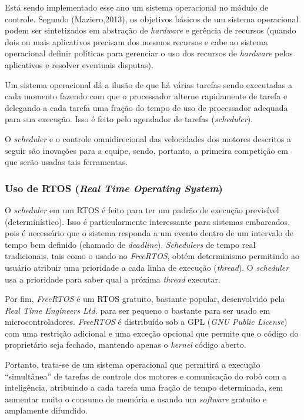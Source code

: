 \documentclass[conference]{IEEEtran}
\begin{document}
Está sendo implementado esse ano um sistema operacional no módulo de controle. Segundo (Maziero,2013)\cite{maziero}, os objetivos básicos de um sistema operacional podem ser sintetizados em abstração de \textit{hardware} e gerência de recursos (quando dois ou mais aplicativos precisam dos mesmos recursos e cabe ao sistema operacional definir políticas para gerenciar o uso dos recursos de \textit{hardware} pelos aplicativos e resolver eventuais disputas).

Um sistema operacional dá a ilusão de que há várias tarefas sendo executadas a cada momento fazendo com que o processador alterne rapidamente de tarefa e delegando a cada tarefa uma fração do tempo de uso de processador adequada para sua execução. Isso é feito pelo agendador de tarefas (\textit{scheduler}).

O \textit{scheduler} e o controle omnidirecional das velocidades dos motores descritos a seguir são inovações para a equipe, sendo, portanto, a primeira competição em que serão usadas tais ferramentas.

\subsubsection{Uso de RTOS (\textit{Real Time Operating System})}

O \textit{scheduler} em um RTOS é feito para ter um padrão de execução previsível (determinístico). Isso é particularmente interessante para sistemas embarcados, pois é necessário que o sistema responda a um evento dentro de um intervalo de tempo bem definido (chamado de \textit{deadline}). \textit{Schedulers} de tempo real tradicionais, tais como o usado no \textit{FreeRTOS}, obtém determinismo permitindo ao usuário atribuir uma prioridade a cada linha de execução (\textit{thread}). O \textit{scheduler} usa a prioridade para saber qual a próxima \textit{thread} executar.

Por fim, \textit{FreeRTOS} é um RTOS gratuito, bastante popular, desenvolvido pela \textit{Real Time Engineers Ltd.} para ser pequeno o bastante para ser usado em microcontroladores. \textit{FreeRTOS} é distribuído sob a GPL (\textit{GNU Public License}) com uma restrição adicional e uma exceção opcional que permite que o código do proprietário seja fechado, mantendo apenas o \textit{kernel} código aberto.

Portanto, trata-se de um sistema operacional que permitirá a execução “simultânea” de tarefas de controle dos motores e comunicação do robô com a inteligência, atribuindo a cada tarefa uma fração de tempo determinada, sem aumentar muito o consumo de memória e usando um \textit{software} gratuito e amplamente difundido.
\end{document}

